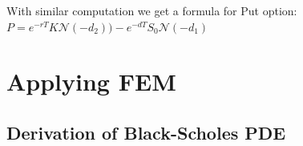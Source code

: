 \documentclass[a4paper]{report}
\begin{document}
\begin{itemize}
\begin{itemize}
\end{itemize}
With similar computation we get a formula for Put option:\\

$P = e^{-rT}K\mathcal{N}(-d_2))-e^{-dT}S_0 \mathcal{N}(-d_1)$\\




















\chapter{Applying FEM}
\section{Derivation of Black-Scholes PDE}

\end{itemize}
\end{document}
